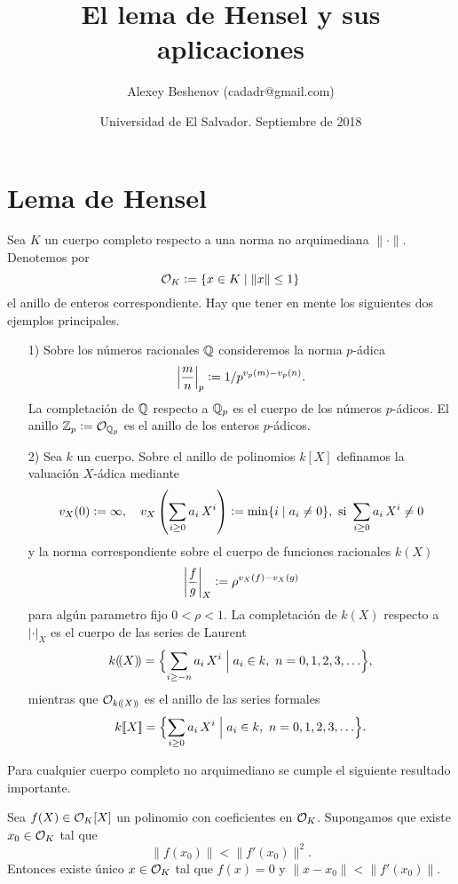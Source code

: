 \documentclass{article}
\author{Alexey Beshenov (cadadr@gmail.com)}
\title{El lema de Hensel y sus aplicaciones}
\date{Universidad de El Salvador. Septiembre de 2018}
\numberwithin{equation}{section}
\theoremstyle{definition}
\begin{document}
{\normalfont\sffamily\bfseries \maketitle}

\section{Lema de Hensel}

Sea $K$ un cuerpo completo respecto a una norma no arquimediana
$\|\cdot\|$. Denotemos por
$$\mathcal{O}_K \mathrel{\mathop:}= \{ x\in K \mid \|x\| \le 1 \}$$
el anillo de enteros correspondiente. Hay que tener en mente los siguientes dos
ejemplos principales.

\begin{enumerate}
\item[1)] Sobre los números racionales $\mathbb{Q}$ consideremos la norma $p$-ádica
$$\left|\frac{m}{n}\right|_p \mathrel{\mathop:}= 1/p^{v_p (m) - v_p (n)}.$$
La completación de $\mathbb{Q}$ respecto a $\mathbb{Q}_p$ es el cuerpo de los números
$p$-ádicos. El anillo $\mathbb{Z}_p\mathrel{\mathop:}= \mathcal{O}_{\mathbb{Q}_p}$ es el anillo de los enteros
$p$-ádicos.

\item[2)] Sea $k$ un cuerpo. Sobre el anillo de polinomios $k [X]$ definamos la
  valuación $X$-ádica mediante
  \[ v_X (0) \mathrel{\mathop:}= \infty, \quad
     v_X \left(\sum_{i\ge 0} a_i\,X^i\right) \mathrel{\mathop:}= \min \{ i \mid a_i \ne 0 \},
     \text{ si }\sum_{i\ge 0} a_i\,X^i \ne 0 \]
  y la norma correspondiente sobre el cuerpo de funciones racionales $k (X)$
  $$\left|\frac{f}{g}\right|_X \mathrel{\mathop:}= \rho^{v_X (f) - v_X (g)}$$
  para algún parametro fijo $0 < \rho < 1$. La completación de $k (X)$ respecto
  a $|\cdot|_X$ es el cuerpo de las series de Laurent
  \[ k (\!(X)\!) = \Bigl\{ \sum_{i \ge -n} a_i\,X^i \Bigm|
                           a_i \in k, ~ n = 0,1,2,3,\ldots \Bigr\}, \]
  mientras que $\mathcal{O}_{k (\!(X)\!)}$ es el anillo de las series formales
  \[ k [\![X]\!] = \Bigl\{ \sum_{i \ge 0} a_i\,X^i \Bigm|
                           a_i \in k, ~ n = 0,1,2,3,\ldots \Bigr\}. \]
\end{enumerate}

Para cualquier cuerpo completo no arquimediano se cumple el siguiente resultado
importante.

\begin{teorema}
\label{teorema:Hensel}
Sea $f (X) \in \mathcal{O}_K [X]$ un polinomio con coeficientes en $\mathcal{O}_K$. Supongamos que
existe $x_0 \in \mathcal{O}_K$ tal que
$$\|f (x_0)\| < \|f' (x_0)\|^2.$$
Entonces existe único $x \in \mathcal{O}_K$ tal que $f (x) = 0$ y
$\|x-x_0\| < \|f' (x_0)\|$.
\end{teorema}
\end{document}
